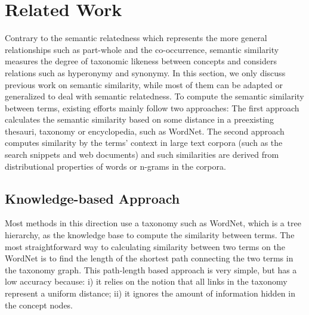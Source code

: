 \section{Related Work}
\label{sec:related}

Contrary to the semantic relatedness which represents the more general relationships such as part-whole and the co-occurrence, semantic
similarity measures the degree of taxonomic likeness between concepts and considers relations such as hyperonymy and synonymy. In this section,
we only discuss previous work on semantic similarity, while most of them can be adapted or generalized to deal with semantic relatedness. To
compute the semantic similarity between terms, existing efforts mainly
follow two approaches: The first approach calculates the semantic
similarity based on some distance in a preexisting thesauri, taxonomy or encyclopedia, such as WordNet. The second approach computes similarity
by the terms' context in large text corpora (such as the search snippets and web documents) and such similarities are derived from
distributional properties of words or n-grams in the corpora.

\subsection{Knowledge-based Approach}

Most methods in this direction use a taxonomy such as WordNet, which is
a tree hierarchy, as the knowledge base to compute
the similarity between terms.
The most straightforward way to calculating similarity between two
terms on the WordNet is to find the length of the shortest path
connecting the two terms in the taxonomy graph\cite{Rada:1989}.
This path-length based approach is very simple, but has a low accuracy
because: i) it relies on the notion that all links in the taxonomy represent
a uniform distance; ii) it ignores the amount of information hidden in the concept nodes.

